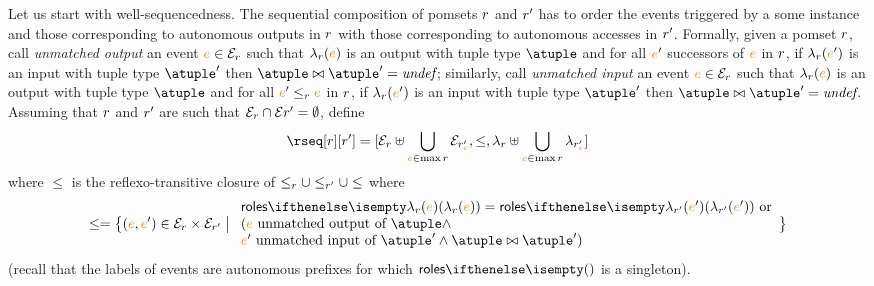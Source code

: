 Let us start with well-sequencedness.
%
The sequential composition of pomsets $r$ and $r'$ has to
order the events triggered by a some instance and those corresponding
to autonomous outputs in $r$ with those corresponding to
autonomous accesses in $r'$.
%
Formally, given a pomset $r$, call \emph{unmatched output} an
event ${\color{orange}{e}} \in \mathcal{E}_{r}$ such that $\lambda_{r}({\color{orange}{e}})$ is an
output with tuple type $\atuple$ and for all ${\color{orange}{e}}'$ successors of
${\color{orange}{e}}$ in $r$, if $\lambda_{r}({\color{orange}{e}}')$ is an input with tuple type
$\atuple'$ then $\atuple \matches \atuple' = \textit{undef}$;
similarly, call \emph{unmatched input} an event
${\color{orange}{e}} \in \mathcal{E}_{r}$ such that $\lambda_{r}({\color{orange}{e}})$ is an output
with tuple type $\atuple$ and for all ${\color{orange}{e}}' \leq_{r} {\color{orange}{e}}$ in
$r$, if $\lambda_{r} ({\color{orange}{e}}')$ is an input with tuple type
$\atuple'$ then $\atuple \matches \atuple' = \textit{undef}$.
%
Assuming that $r$ and $r'$ are such that
$\mathcal{E}_{r} \cap \mathcal{E} r' = \emptyset$, define
\[
  \rseq[\apom][\apom'] = 
  [\esetof{\apom} \uplus \bigcup_{\ae \in \max \apom}\esetof{\apom'_{\ae}},
  \leq,
  \alfof{\apom} \uplus \bigcup_{\ae \in \max \apom}\alfof{\apom'_{\ae}}]
\]
where $\leq$ is the reflexo-transitive closure of
$  \leq_{r} \cup
  \leq_{r'} \cup \leq$
where
\[
  \leq = 
  \big\{(\ae, \ae') \in \esetof \apom \times \esetof{\apom'} \sst 
  \begin{array}{l}
    \roles{\alfof{\apom}(\ae)} = \roles{\alfof{\apom'}(\ae')}
    \text{ or}
    \\
    (\ae \text{ unmatched output of $\atuple$} \land
    \\
    \ae' \text{ unmatched input of $\atuple'$} \land
    \atuple \matches \atuple')
  \end{array}
  \big\}
\]
(recall that the labels of events are autonomous prefixes for which
$\roles{}$ is a singleton).
%
%

